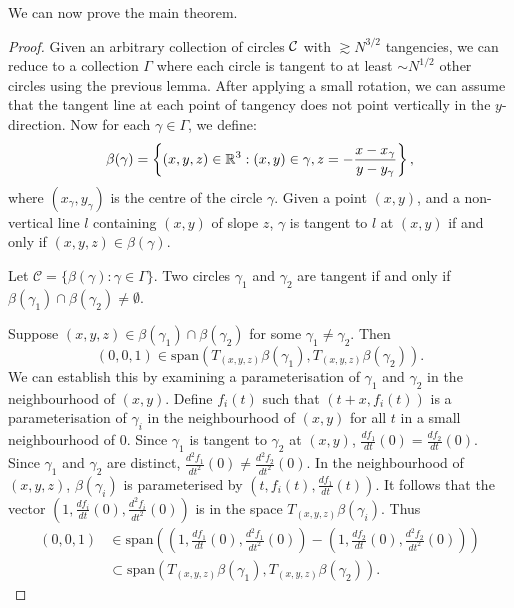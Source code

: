 We can now prove the main theorem.
\begin{proof}
    Given an arbitrary collection of circles $\mathcal C$ with $\gtrsim N^{3/2}$ tangencies, we can reduce to a collection $\Gamma$ where each circle is tangent to at least $\sim N^{1/2}$ other circles using the previous lemma. 
    After applying a small rotation, we can assume that the tangent line at each point of tangency does not point vertically in the $y$-direction.
    Now for each $\gamma \in \Gamma$, we define:
    $$\beta(\gamma) = \left \{ (x,y,z) \in \mathbb R^3 : (x,y) \in \gamma, z = - \frac{x-x_\gamma}{y-y_\gamma} \right \},$$ where $(x_\gamma,y_\gamma)$ is the 
    centre of the circle $\gamma$. Given a point $(x,y)$, and a non-vertical line $l$ containing $(x,y)$ of slope $z$, $\gamma$ is tangent to $l$ at $(x,y)$ if and only if $(x,y,z) \in \beta(\gamma)$.

    Let $\mathscr{C} = \{ \beta(\gamma) : \gamma \in \Gamma \}.$ 
    Two circles $\gamma_1$ and $\gamma_2$ are tangent if and only if $\beta(\gamma_1) \cap \beta(\gamma_2) \neq \emptyset$.

    Suppose $(x,y,z) \in \beta(\gamma_1) \cap \beta(\gamma_2) $ for some $\gamma_1 \neq \gamma_2$. Then $$(0,0,1) \in \text{span} \left( T_{(x,y,z) }\beta (\gamma_1), T_{(x,y,z) }\beta (\gamma_2)\right).$$
    We can establish this by examining a parameterisation of $\gamma_1$ and $\gamma_2$ in the neighbourhood of $(x,y)$.
    Define $f_i (t)$ such that $(t+x, f_i(t))$ is a parameterisation of $\gamma_i$ in the neighbourhood of $(x,y)$ for all $t$ in a small neighbourhood of 0. 
    Since $\gamma_1$ is tangent to $\gamma_2$ at $(x,y)$, $\frac{df_1}{dt}(0) = \frac{df_2}{dt}(0)$. 
    Since $\gamma_1$ and $\gamma_2$ are distinct, $\frac{d^2f_1}{dt^2}(0) \neq \frac{d^2f_2}{dt^2}(0)$.
    In the neighbourhood of $(x,y,z)$, $\beta(\gamma_i)$ is parameterised by $\left(t,f_i (t) ,\frac{df_1}{dt}(t) \right)$. It follows that the vector
    $\left(1,\frac{df_i}{dt}(0), \frac{d^2f_i}{dt^2} (0) \right)$ is in the space $T_{(x,y,z)} \beta(\gamma_i)$. Thus 
    \begin{align*} (0,0,1) &\in \text{span}\left( \left(1,\frac{df_1}{dt}(0), \frac{d^2f_1}{dt^2} (0) \right) - \left(1,\frac{df_2}{dt}(0), \frac{d^2f_2}{dt^2} (0) \right) \right)
    \\ &\subset \text{span} \left( T_{(x,y,z) }\beta (\gamma_1), T_{(x,y,z) }\beta (\gamma_2)\right). 
    \end{align*}


\end{proof}
